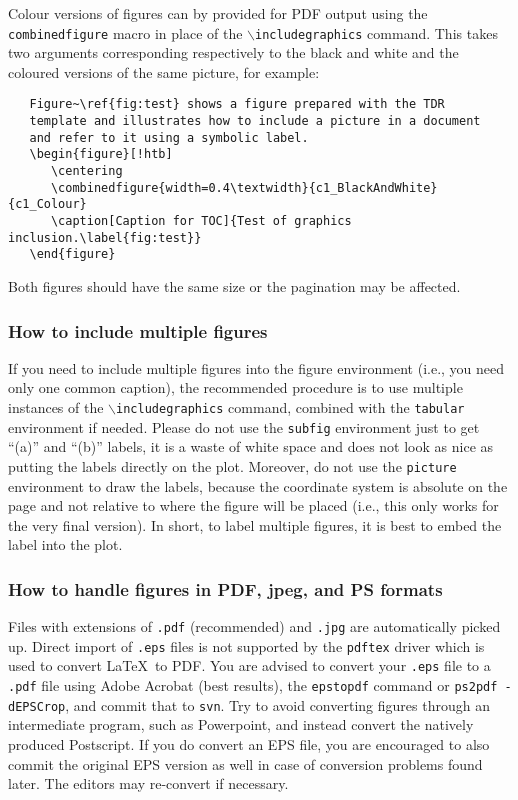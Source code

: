 Colour versions of figures can by provided for PDF output using the \verb+combinedfigure+ macro
in place of the  \texttt{$\backslash$includegraphics} command.
This takes two arguments corresponding  respectively to the black and white
and the coloured versions of the same picture, for example:
%
\vspace*{-2.5ex}\begin{verbatim}
   Figure~\ref{fig:test} shows a figure prepared with the TDR
   template and illustrates how to include a picture in a document
   and refer to it using a symbolic label.
   \begin{figure}[!htb]
      \centering
      \combinedfigure{width=0.4\textwidth}{c1_BlackAndWhite}{c1_Colour}
      \caption[Caption for TOC]{Test of graphics inclusion.\label{fig:test}}
   \end{figure}
\end{verbatim}
%
Both figures should have the same size or the pagination may be affected.


\subsubsection{How to include multiple figures}

If you need to include multiple figures into the figure environment
(i.e., you need only one common caption), the recommended procedure is to
use multiple instances of the \texttt{$\backslash$includegraphics} command, combined
with the \texttt{tabular} environment if needed. Please do not use the
\texttt{subfig} environment just to get ``(a)'' and ``(b)'' labels, it
is a waste of white space and does not look as nice as putting the
labels directly on the plot. Moreover, do not use the \texttt{picture}
environment to draw the labels, because the coordinate system is
absolute on the page and not relative to where the figure will be
placed (i.e., this only works for the very final version). In short, to
label multiple figures, it is best to embed the label into the plot.



\subsubsection{How to handle figures in PDF, jpeg, and PS formats}

Files with extensions of \texttt{.pdf} (recommended) and \texttt{.jpg}
are automatically picked up.
Direct import of \texttt{.eps} files is not
supported by the \texttt{pdftex} driver which is used to convert
\LaTeX\ to PDF.
You are advised to convert your \texttt{.eps} file to a \texttt{.pdf} file
using Adobe Acrobat (best results), the \texttt{epstopdf}
command or \texttt{ps2pdf -dEPSCrop}, and commit that to \texttt{svn}.
Try to avoid converting figures through an intermediate program, such
as Powerpoint, and instead convert the natively produced
Postscript. If you do convert an EPS file, you are encouraged to also
commit the original EPS version as well in case of conversion
problems found later. The editors may re-convert if necessary.


